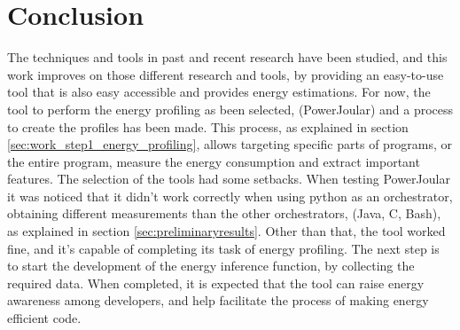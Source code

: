 
\chapter{Conclusion}

The techniques and tools in past and recent research have been studied, and this work improves on those different research and tools, by providing an easy-to-use tool that is also easy accessible and provides energy estimations.
For now, the tool to perform the energy profiling as been selected, (PowerJoular) and a process to create the profiles has been made. This process, as explained in section \ref{sec:work_step1_energy_profiling}, allows targeting specific parts of programs, or the entire program, measure the energy consumption and extract important features. The selection of the tools had some setbacks. When testing PowerJoular it was noticed that it didn't work correctly when using python as an orchestrator, obtaining different measurements than the other orchestrators, (Java, C, Bash), as explained in section \ref{sec:preliminaryresults}. Other than that, the tool worked fine, and it's capable of completing its task of energy profiling. The next step is to start the development of the energy inference function, by collecting the required data. When completed, it is expected that the tool can raise energy awareness among developers, and help facilitate the process of making energy efficient code.
